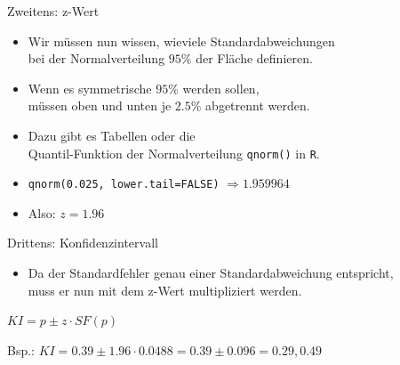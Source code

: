 \begin{frame}
  {Zweitens: z-Wert}
  \begin{itemize}[<+->]
    \item Wir müssen nun wissen, wieviele Standardabweichungen\\
      bei der Normalverteilung $95\%$ der Fläche definieren.
    \item Wenn es \alert{symmetrische $95\%$} werden sollen,\\
      müssen \alert{oben und unten je $2.5\%$} abgetrennt werden.
    \item Dazu gibt es Tabellen oder die\\
      \alert{Quantil-Funktion der Normalverteilung \texttt{qnorm()}} in \texttt{R}.
    \item \texttt{qnorm(0.025, lower.tail=FALSE)} $\Rightarrow 1.959964$
    \item Also: \alert{$z=1.96$}
  \end{itemize}
\end{frame}

\begin{frame}
  {Drittens: Konfidenzintervall}
  \begin{itemize}[<+->]
    \item Da \alert{der Standardfehler genau einer Standardabweichung entspricht},\\
      muss er nun \alert{mit dem z-Wert multipliziert} werden.
  \end{itemize}
  \pause
  \vspace{.5cm}
  \begin{center}
    \alert{$KI=p\pm z\cdot SF(p)$}

    \vspace{.2cm}
    Bsp.: $KI=0.39\pm1.96\cdot 0.0488=0.39\pm0.096=0.29, 0.49$
  \end{center}
\end{frame}

